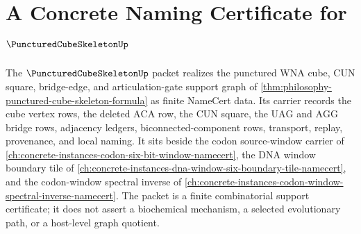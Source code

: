 \chapter{A Concrete Naming Certificate for $\PuncturedCubeSkeletonUp$}
\label{ch:concrete-instances-punctured-cube-skeleton-namecert}

The $\PuncturedCubeSkeletonUp$ packet realizes the punctured WNA cube, CUN square, bridge-edge, and articulation-gate support graph of \autoref{thm:philosophy-punctured-cube-skeleton-formula} as finite NameCert data. Its carrier records the cube vertex rows, the deleted $\mathrm{ACA}$ row, the CUN square, the $\mathrm{UAG}$ and $\mathrm{AGG}$ bridge rows, adjacency ledgers, biconnected-component rows, transport, replay, provenance, and local naming. It sits beside the codon source-window carrier of \autoref{ch:concrete-instances-codon-six-bit-window-namecert}, the DNA window boundary tile of \autoref{ch:concrete-instances-dna-window-six-boundary-tile-namecert}, and the codon-window spectral inverse of \autoref{ch:concrete-instances-codon-window-spectral-inverse-namecert}. The packet is a finite combinatorial support certificate; it does not assert a biochemical mechanism, a selected evolutionary path, or a host-level graph quotient.

